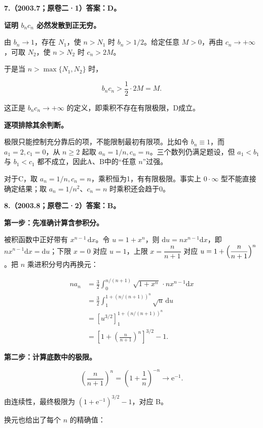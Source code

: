 \documentclass[UTF8,11pt,fontset=windows]{ctexart}
\begin{document}
\textbf{7.（2003.7；原卷二·1）答案：D。}

\textbf{证明 $b_nc_n$ 必然发散到正无穷。}

由 $b_n\to1$，存在 $N_1$，使 $n>N_1$ 时 $b_n>1/2$。给定任意 $M>0$，再由 $c_n\to+\infty$，可取 $N_2$，使 $n>N_2$ 时 $c_n>2M$。

于是当 $n>\max\{N_1,N_2\}$ 时，

$$
b_nc_n>\frac12\cdot2M=M.
$$

这正是 $b_nc_n\to+\infty$ 的定义，即乘积不存在有限极限，D成立。

\textbf{逐项排除其余判断。}

极限只能控制充分靠后的项，不能限制最初有限项。比如令 $b_n\equiv1$，而 $a_1=2,c_1=0$，从 $n\ge2$ 起取 $a_n=1/n,c_n=n$。三个数列仍满足题设，但 $a_1<b_1$ 与 $b_1<c_1$ 都不成立，因此A、B中的“任意 $n$”过强。

对于C，取 $a_n=1/n,c_n=n$，乘积恒为1，有有限极限。事实上 $0\cdot\infty$ 型不能直接确定结果；取 $a_n=1/n^2$、$c_n=n$ 时乘积还会趋于0。

\clearpage

\textbf{8.（2003.8；原卷二·2）答案：B。}

\textbf{第一步：先准确计算含参积分。}

被积函数中正好带有 $x^{n-1}\,\mathrm dx$。令 $u=1+x^n$，则 $\mathrm du=nx^{n-1}\mathrm dx$，即 $nx^{n-1}\mathrm dx=\mathrm du$；下限 $x=0$ 对应 $u=1$，上限 $x=\dfrac n{n+1}$ 对应 $u=1+\Bigl(\dfrac n{n+1}\Bigr)^n$。把 $n$ 乘进积分号内再换元：

$$
\begin{aligned}
na_n
&=\frac32\int_0^{n/(n+1)}\sqrt{1+x^n}\,\cdot nx^{n-1}\mathrm dx\\
&=\frac32\int_1^{1+(n/(n+1))^n}\sqrt u\,\mathrm du\\
&=\left[u^{3/2}\right]_1^{1+(n/(n+1))^n}\\
&=\left[1+\left(\frac n{n+1}\right)^n\right]^{3/2}-1.
\end{aligned}
$$

\textbf{第二步：计算底数中的极限。}

$$
\left(\frac n{n+1}\right)^n
=\left(1+\frac1n\right)^{-n}\longrightarrow\mathrm e^{-1}.
$$

由连续性，最终极限为 $(1+\mathrm e^{-1})^{3/2}-1$，对应 B。

换元也给出了每个 $n$ 的精确值：
\end{document}
